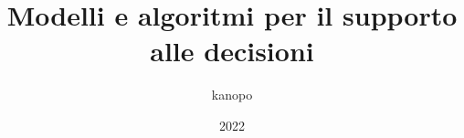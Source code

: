 \documentclass{article}
\begin{document}
    \author{kanopo}
    \title{Modelli e algoritmi per il supporto alle decisioni}
    \date{2022}

    \maketitle
    \tableofcontents

    \listoffigures
    \listoftables


    
    

    
\end{document}
